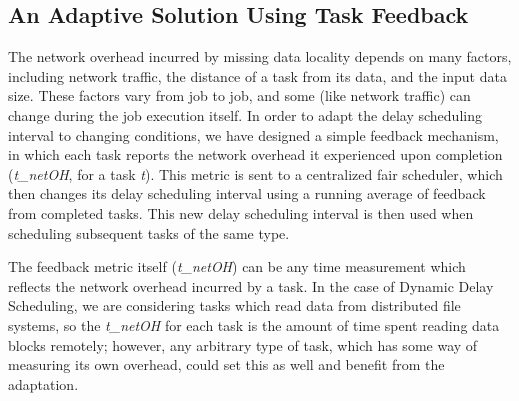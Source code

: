 


\subsection{An Adaptive Solution Using Task Feedback}

The network overhead incurred by missing data locality depends on many factors, including 
network traffic, the distance of a task from its data, and the input data size. These 
factors vary from job to job, and some (like network traffic) can change during the job 
execution itself. In order to adapt the delay scheduling interval to changing conditions, 
we have designed a simple feedback mechanism, in which each task reports the network overhead it experienced 
upon completion (\textit{t\_netOH}, for a task \textit{t}). This metric is sent to a 
centralized fair scheduler, which then changes its delay scheduling interval using a 
running average of feedback from completed tasks. This new delay scheduling interval is 
then used when scheduling subsequent tasks of the same type.

The feedback metric itself (\textit{t\_netOH}) can be any time measurement which 
reflects the network overhead incurred by a task. In the case of Dynamic Delay Scheduling, we are 
considering tasks which read data from distributed file systems,
so the \textit{t\_netOH} for each task is the amount of time spent 
reading data blocks remotely; however, any arbitrary type of task, which has some way of 
measuring its own overhead, could set this as well and benefit from the adaptation.


